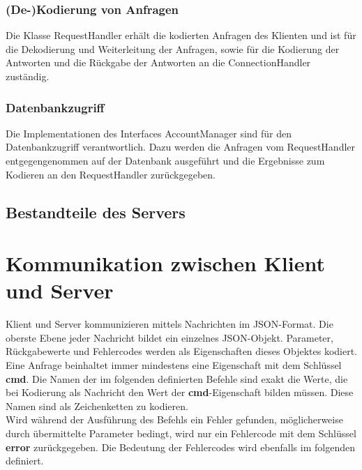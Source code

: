 \documentclass[parskip=full,11pt]{scrartcl}
\begin{document}
\subsubsection{(De-)Kodierung von Anfragen}
Die Klasse RequestHandler erhält die kodierten Anfragen des Klienten und
ist für die Dekodierung und Weiterleitung der Anfragen, sowie für
die Kodierung der Antworten und die Rückgabe der Antworten an die
ConnectionHandler zuständig.

\subsubsection{Datenbankzugriff}
Die Implementationen des Interfaces AccountManager sind für den
Datenbankzugriff verantwortlich. Dazu werden die Anfragen vom RequestHandler
entgegengenommen auf der Datenbank ausgeführt und die Ergebnisse zum Kodieren
an den RequestHandler zurückgegeben.

\subsection{Bestandteile des Servers}


\pagebreak
\section{Kommunikation zwischen Klient und Server}
Klient und Server kommunizieren mittels Nachrichten im JSON-Format.
Die oberste Ebene jeder Nachricht bildet ein einzelnes JSON-Objekt.
Parameter, Rückgabewerte und Fehlercodes werden als Eigenschaften dieses
Objektes kodiert.
Eine Anfrage beinhaltet immer mindestens eine Eigenschaft mit dem Schlüssel
\textbf{cmd}.
Die Namen der im folgenden definierten Befehle sind exakt die Werte, die bei
Kodierung als Nachricht den Wert der \textbf{cmd}-Eigenschaft bilden müssen.
Diese Namen sind als Zeichenketten zu kodieren.
\\Wird während der Ausführung des Befehls ein Fehler gefunden, möglicherweise
durch übermittelte Parameter bedingt, wird nur ein Fehlercode mit dem Schlüssel
\textbf{error} zurückgegeben. Die Bedeutung der Fehlercodes wird ebenfalls im
folgenden definiert.
\end{document}

